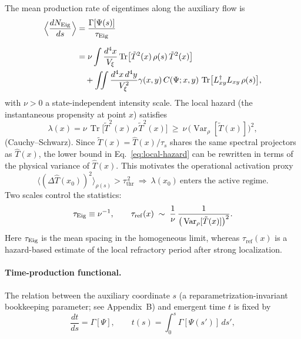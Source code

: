 \documentclass[12pt,a4paper]{article}
\newcommand{\Var}{\operatorname{Var}}
\renewcommand{\Tr}{\operatorname{Tr}}
\newcommand{\Vxi}{V_\xi}          %
\newcommand{\intx}{\int \frac{d^4x}{\Vxi}}
\newcommand{\intxy}{\iint \frac{d^4x\,d^4y}{\Vxi^2}}
\numberwithin{equation}{section}
\begin{document}
\noindent The mean production rate of eigentimes along the auxiliary flow is
\begin{equation}
\begin{split}
\Big\langle\frac{dN_{\mathrm{Eig}}}{ds}\Big\rangle
&= \frac{\Gamma[\Psi(s)]}{\tau_{\rm Eig}} \\[6pt]
&= \nu \intx \Tr\!\big[\tilde{T}^2(x)\,\rho(s)\,\tilde{T}^2(x)\big] \\
&\quad + \intxy \gamma(x,y)\,C(\Psi;x,y)\,\Tr\!\big[L_{xy}^\dagger L_{xy}\,\rho(s)\big],
\end{split}
\label{eq:eigrate}
\end{equation}
with $\nu>0$ a state-independent intensity scale. The local hazard (the instantaneous propensity at point $x$) satisfies
\begin{equation}
\lambda(x)=\nu\,\Tr\!\big[\tilde{T}^2(x)\,\rho\,\tilde{T}^2(x)\big]
\ \ge\ \nu\,\big(\Var_\rho[\tilde{T}(x)]\big)^2,
\label{eq:local-hazard}
\end{equation}
(Cauchy--Schwarz). Since $\tilde{T}(x)=\hat{T}(x)/\tau_s$ shares the same
spectral projectors as $\hat{T}(x)$, the lower bound in
Eq.~\eqref{eq:local-hazard} can be rewritten in terms of the physical
variance of $\hat{T}(x)$. This motivates the operational activation proxy
\begin{equation}
\big\langle(\Delta\hat T(x_0))^2\big\rangle_{\rho(s)}>\tau_{\mathrm{thr}}^{\,2}
\ \Longrightarrow\ \lambda(x_0)\ \text{enters the active regime}.
\label{eq:locthreshold}
\end{equation}
Two scales control the statistics:
\begin{equation}
\tau_{\rm Eig} \equiv \nu^{-1},\qquad
\tau_{\mathrm{ref}}(x)\;\sim\;\frac{1}{\nu}\,
\frac{1}{\big(\Var_{\rho}[\tilde{T}(x)]\big)^{2}}.
\label{eq:eigscale}
\end{equation}
Here $\tau_{\rm Eig}$ is the mean spacing in the homogeneous limit, whereas $\tau_{\mathrm{ref}}(x)$ is a hazard-based estimate of the local refractory period after strong localization.

\paragraph{Time-production functional.}
The relation between the auxiliary coordinate $s$ (a reparametrization-invariant bookkeeping parameter; see Appendix~B) and emergent time $t$ is fixed by
\begin{equation}
\frac{dt}{ds} = \Gamma[\Psi], \qquad
t(s) = \int_0^s \Gamma[\Psi(s')]\, ds',
\label{eq:s-to-t-bootstrap}
\end{equation}
\end{document}
